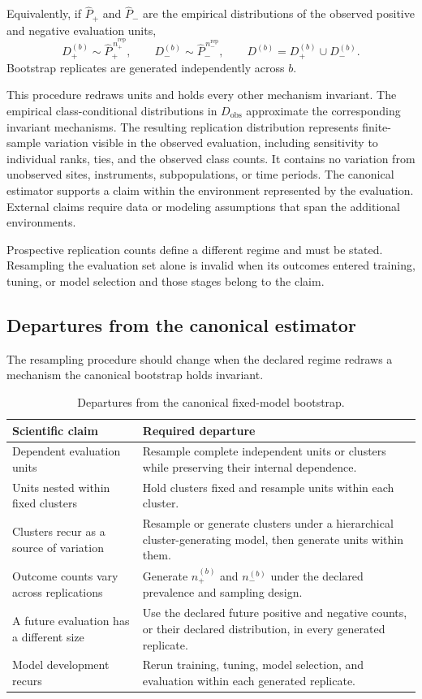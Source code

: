 \documentclass[11pt]{article}
\theoremstyle{remark}
\begin{document}
Equivalently, if $\widehat P_+$ and $\widehat P_-$ are the empirical distributions of the observed positive and negative evaluation units,
\[
D_+^{(b)}\sim \widehat P_+^{\,n_+^{\mathrm{rep}}},
\qquad
D_-^{(b)}\sim \widehat P_-^{\,n_-^{\mathrm{rep}}},
\qquad
D^{(b)}=D_+^{(b)}\cup D_-^{(b)}.
\]
Bootstrap replicates are generated independently across $b$.

This procedure redraws units and holds every other mechanism invariant. The empirical class-conditional distributions in $D_{\mathrm{obs}}$ approximate the corresponding invariant mechanisms. The resulting replication distribution represents finite-sample variation visible in the observed evaluation, including sensitivity to individual ranks, ties, and the observed class counts. It contains no variation from unobserved sites, instruments, subpopulations, or time periods. The canonical estimator supports a claim within the environment represented by the evaluation. External claims require data or modeling assumptions that span the additional environments.

Prospective replication counts define a different regime and must be stated. Resampling the evaluation set alone is invalid when its outcomes entered training, tuning, or model selection and those stages belong to the claim.

\subsection{Departures from the canonical estimator}

The resampling procedure should change when the declared regime redraws a mechanism the canonical bootstrap holds invariant.

\begin{table}[ht]
\centering
\caption{Departures from the canonical fixed-model bootstrap.}
\label{tab:replication}
\begin{tabularx}{\textwidth}{@{}>{\raggedright\arraybackslash}p{}>{\raggedright\arraybackslash}X@{}}
\toprule
Scientific claim & Required departure \\
\midrule
Dependent evaluation units & Resample complete independent units or clusters while preserving their internal dependence. \\
Units nested within fixed clusters & Hold clusters fixed and resample units within each cluster. \\
Clusters recur as a source of variation & Resample or generate clusters under a hierarchical cluster-generating model, then generate units within them. \\
Outcome counts vary across replications & Generate $n_+^{(b)}$ and $n_-^{(b)}$ under the declared prevalence and sampling design. \\
A future evaluation has a different size & Use the declared future positive and negative counts, or their declared distribution, in every generated replicate. \\
Model development recurs & Rerun training, tuning, model selection, and evaluation within each generated replicate. \\
\bottomrule
\end{tabularx}
\end{table}
\end{document}
